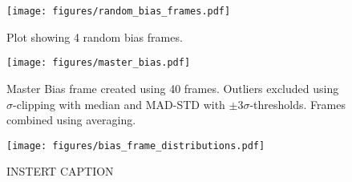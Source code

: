 \documentclass{aastex631}
\begin{document}
\begin{figure}[ht!]
    \begin{centering}
        \texttt{[image: figures/random\_bias\_frames.pdf]}
        \caption{
            Plot showing 4 random bias frames.
        }
        \label{fig:random_bias}
    \end{centering}
\end{figure}

\begin{figure}[ht!]
    \begin{centering}
        \texttt{[image: figures/master\_bias.pdf]}
        \caption{
            Master Bias frame created using 40 frames. Outliers excluded using $\sigma$-clipping with median and MAD-STD with $\pm3\sigma$-thresholds. Frames combined using averaging.
        }
        \label{fig:master_bias}
    \end{centering}
\end{figure}

\begin{figure}[ht!]
    \begin{centering}
        \texttt{[image: figures/bias\_frame\_distributions.pdf]}
        \caption{
            INSTERT CAPTION
        }
        \label{fig:master_bias}
    \end{centering}
\end{figure}


\end{document}
